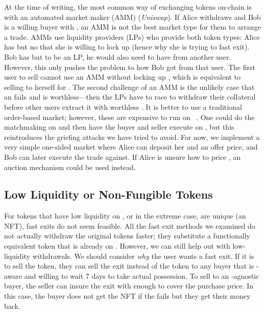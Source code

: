 At the time of writing, the most common way of exchanging tokens on-chain is with an automated market maker (AMM) (\eg \textit{Uniswap}). If Alice withdraws \ethxx and Bob is a willing buyer with \ethone, an AMM is not the best market type for them to arrange a trade. AMMs use liquidity providers (LPs) who provide both token types: Alice has \ethxx but no \ethone that she is willing to lock up (hence why she is trying to fast exit). Bob has \ethone but to be an LP, he would also need to have \ethxx from another user. However, this only pushes the problem to how Bob got \ethxx from that user. The first user to sell \ethxx cannot use an AMM without locking up \ethone, which is equivalent to selling \ethxx to herself for \ethone. The second challenge of an AMM is the unlikely case that an \rblock fails and \ethxx is worthless---then the LPs have to race to withdraw their collateral before other users extract it with worthless \ethxx. It is better to use a traditional order-based market; however, these are expensive to run on \layerone~\cite{moosavi2021lissy}. One could do the matchmaking on \layertwo and then have the buyer and seller execute on \layerone, but this reintroduces the griefing attacks we have tried to avoid. For now, we implement a very simple one-sided market where Alice can deposit her \ethxx and an offer price, and Bob can later execute the trade against. If Alice is unsure how to price \ethxx, an auction mechanism could be used instead. 

\subsection{Low Liquidity or Non-Fungible Tokens}
\label{sec:nfts}

For tokens that have low liquidity on \layerone, or in the extreme case, are unique (\eg an NFT), fast exits do not seem feasible. All the fast exit methods we examined do not actually withdraw the original tokens faster; they substitute a functionally equivalent token that is already on \layerone. However, we can still help out with low-liquidity withdrawals. We should consider \textit{why} the user wants a fast exit. If it is to sell the token, they can sell the exit instead of the token to any buyer that is \layertwo-aware and willing to wait 7 days to take actual possession. To sell to an \layertwo-agnostic buyer, the seller can insure the exit with enough \fail to cover the purchase price. In this case, the buyer does not get the NFT if the \rblock fails but they get their money back.  


